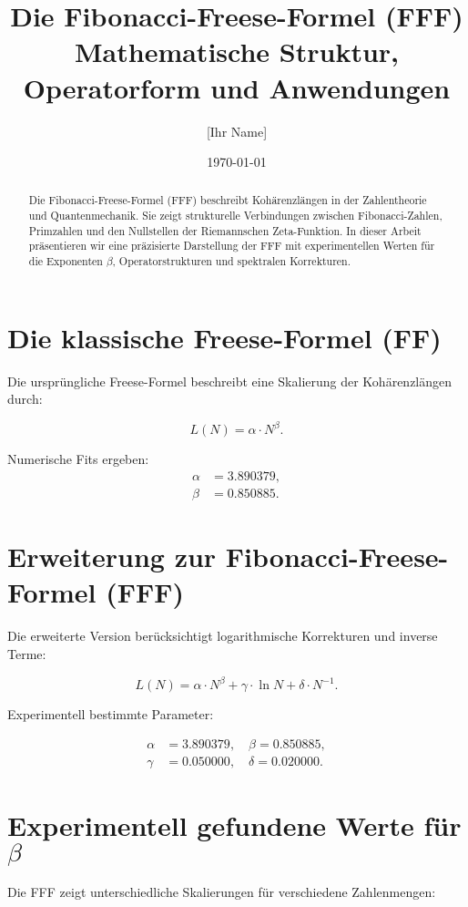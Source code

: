 \documentclass[a4paper,12pt]{article}
\title{Die Fibonacci-Freese-Formel (FFF) \\ Mathematische Struktur, Operatorform und Anwendungen}
\author{[Ihr Name]}
\date{\today}
\begin{document}
\maketitle

\begin{abstract}
Die Fibonacci-Freese-Formel (FFF) beschreibt Kohärenzlängen in der Zahlentheorie und Quantenmechanik.
Sie zeigt strukturelle Verbindungen zwischen Fibonacci-Zahlen, Primzahlen und den Nullstellen der
Riemannschen Zeta-Funktion. In dieser Arbeit präsentieren wir eine präzisierte Darstellung der FFF mit
experimentellen Werten für die Exponenten $\beta$, Operatorstrukturen und spektralen Korrekturen.
\end{abstract}

\section{Die klassische Freese-Formel (FF)}
Die ursprüngliche Freese-Formel beschreibt eine Skalierung der Kohärenzlängen durch:

\begin{equation}
L(N) = \alpha \cdot N^\beta.
\end{equation}

Numerische Fits ergeben:
\begin{align}
\alpha &= 3.890379, \\
\beta &= 0.850885.
\end{align}

\section{Erweiterung zur Fibonacci-Freese-Formel (FFF)}
Die erweiterte Version berücksichtigt logarithmische Korrekturen und inverse Terme:

\begin{equation}
L(N) = \alpha \cdot N^\beta + \gamma \cdot \ln N + \delta \cdot N^{-1}.
\end{equation}

Experimentell bestimmte Parameter:

\begin{align}
\alpha &= 3.890379, \quad \beta = 0.850885, \\
\gamma &= 0.050000, \quad \delta = 0.020000.
\end{align}

\section{Experimentell gefundene Werte für $\beta$}
Die FFF zeigt unterschiedliche Skalierungen für verschiedene Zahlenmengen:
\end{document}
